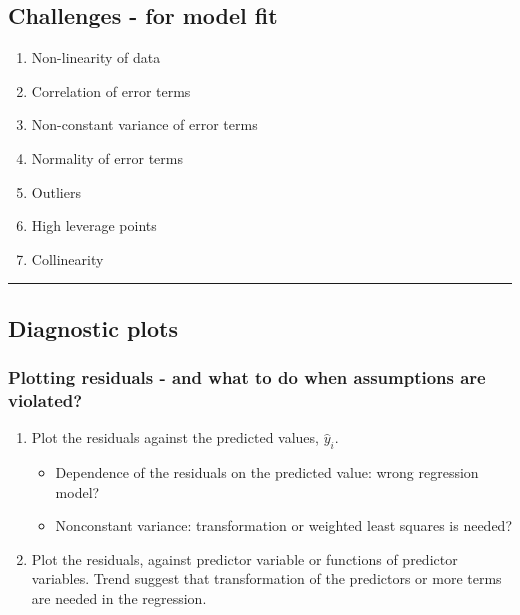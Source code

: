 \documentclass[]{article}
\providecommand{\tightlist}{%
  \setlength{\itemsep}{0pt}\setlength{\parskip}{0pt}}
\begin{document}
\hypertarget{challenges---for-model-fit}{%
\subsection{Challenges - for model
fit}\label{challenges---for-model-fit}}

\begin{enumerate}
\def\labelenumi{\arabic{enumi}.}
\tightlist
\item
  Non-linearity of data
\item
  Correlation of error terms
\item
  Non-constant variance of error terms
\item
  Normality of error terms
\item
  Outliers
\item
  High leverage points
\item
  Collinearity
\end{enumerate}

\begin{center}\rule{0.5\linewidth}{\linethickness}\end{center}

\hypertarget{diagnostic-plots}{%
\subsection{Diagnostic plots}\label{diagnostic-plots}}

\hypertarget{plotting-residuals---and-what-to-do-when-assumptions-are-violated}{%
\subsubsection{Plotting residuals - and what to do when assumptions are
violated?}\label{plotting-residuals---and-what-to-do-when-assumptions-are-violated}}

\begin{enumerate}
\def\labelenumi{\arabic{enumi}.}
\tightlist
\item
  Plot the residuals against the predicted values, \(\hat{y}_i\).

  \begin{itemize}
  \tightlist
  \item
    Dependence of the residuals on the predicted value: wrong regression
    model?
  \item
    Nonconstant variance: transformation or weighted least squares is
    needed?
  \end{itemize}
\item
  Plot the residuals, against predictor variable or functions of
  predictor variables. Trend suggest that transformation of the
  predictors or more terms are needed in the regression.
\end{enumerate}
\end{document}
